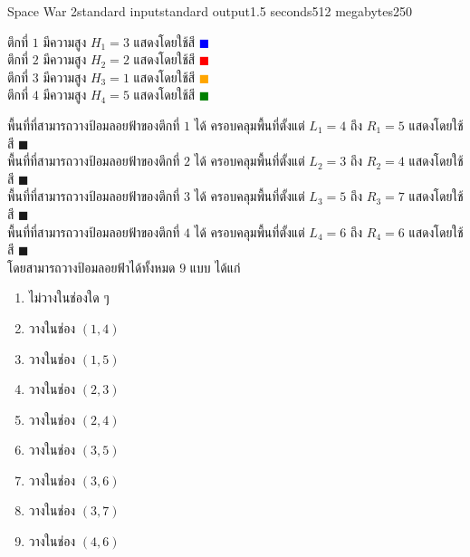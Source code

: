\documentclass[11pt,a4paper]{article}
\begin{document}
\begin{problem}{Space War 2}{standard input}{standard output}{1.5 seconds}{512 megabytes}{250}
\begin{center}
{
} 
\end{center}

ตึกที่ $1$ มีความสูง $H_1=3$ แสดงโดยใช้สี \textcolor{blue}{$\blacksquare$} \\
ตึกที่ $2$ มีความสูง $H_2=2$ แสดงโดยใช้สี \textcolor{red}{$\blacksquare$} \\
ตึกที่ $3$ มีความสูง $H_3=1$ แสดงโดยใช้สี \textcolor{orange}{$\blacksquare$} \\
ตึกที่ $4$ มีความสูง $H_4=5$ แสดงโดยใช้สี \textcolor{green}{$\blacksquare$}

พื้นที่ที่สามารถวางป้อมลอยฟ้าของตึกที่ $1$ ได้ ครอบคลุมพื้นที่ตั้งแต่ $L_1=4$ ถึง $R_1=5$ แสดงโดยใช้สี \textcolor{blue!40!white}{$\blacksquare$} \\
พื้นที่ที่สามารถวางป้อมลอยฟ้าของตึกที่ $2$ ได้ ครอบคลุมพื้นที่ตั้งแต่ $L_2=3$ ถึง $R_2=4$ แสดงโดยใช้สี \textcolor{red!40!white}{$\blacksquare$} \\
พื้นที่ที่สามารถวางป้อมลอยฟ้าของตึกที่ $3$ ได้ ครอบคลุมพื้นที่ตั้งแต่ $L_3=5$ ถึง $R_3=7$ แสดงโดยใช้สี \textcolor{orange!40!white}{$\blacksquare$} \\
พื้นที่ที่สามารถวางป้อมลอยฟ้าของตึกที่ $4$ ได้ ครอบคลุมพื้นที่ตั้งแต่ $L_4=6$ ถึง $R_4=6$ แสดงโดยใช้สี \textcolor{green!40!white}{$\blacksquare$} \\

โดยสามารถวางป้อมลอยฟ้าได้ทั้งหมด $9$ แบบ ได้แก่
\begin{enumerate}
    \item ไม่วางในช่องใด ๆ
    \item วางในช่อง $(1,4)$
    \item วางในช่อง $(1,5)$
    \item วางในช่อง $(2,3)$
    \item วางในช่อง $(2,4)$
    \item วางในช่อง $(3,5)$
    \item วางในช่อง $(3,6)$
    \item วางในช่อง $(3,7)$
    \item วางในช่อง $(4,6)$
\end{enumerate}


\end{problem}
\end{document}
